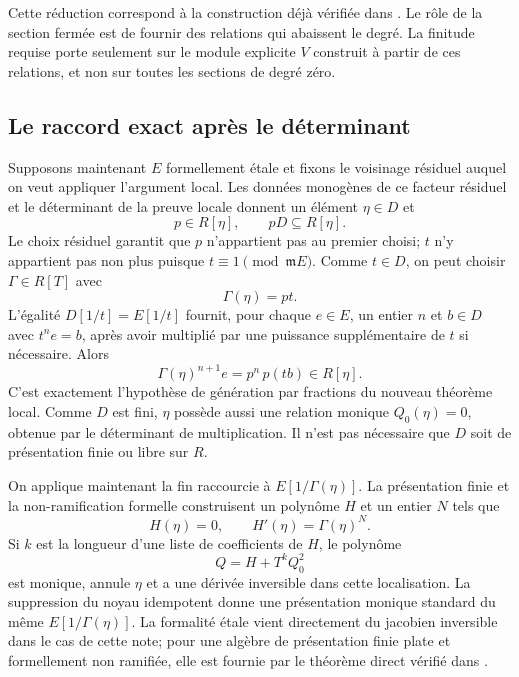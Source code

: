 \documentclass[11pt]{amsart}
\newcommand{\m}{\mathfrak m}
\begin{document}
Cette réduction correspond à la construction déjà vérifiée dans
. Le rôle de la section
fermée est de fournir des relations qui abaissent le degré. La finitude
requise porte seulement sur le module explicite $V$ construit à partir
de ces relations, et non sur toutes les sections de degré zéro.

\subsection{Le raccord exact après le déterminant}

Supposons maintenant $E$ formellement étale et fixons le voisinage
résiduel auquel on veut appliquer l'argument local. Les données
monogènes de ce facteur résiduel et le déterminant de la preuve locale
donnent un élément $\eta\in D$ et
\[
                p\in R[\eta],\qquad pD\subseteq R[\eta].
\]
Le choix résiduel garantit que $p$ n'appartient pas au premier choisi;
$t$ n'y appartient pas non plus puisque $t\equiv1\pmod{\m E}$.
Comme $t\in D$, on peut choisir $\Gamma\in R[T]$ avec
\[
                            \Gamma(\eta)=pt.
\]
L'égalité $D[1/t]=E[1/t]$ fournit, pour chaque $e\in E$, un entier
$n$ et $b\in D$ avec $t^ne=b$, après avoir multiplié par une
puissance supplémentaire de $t$ si nécessaire. Alors
\[
                 \Gamma(\eta)^{n+1}e=p^n\,p(tb)\in R[\eta].
\]
C'est exactement l'hypothèse de génération par fractions du nouveau
théorème local. Comme $D$ est fini, $\eta$ possède aussi une relation
monique $Q_0(\eta)=0$, obtenue par le déterminant de multiplication.
Il n'est pas nécessaire que $D$ soit de présentation finie ou libre
sur $R$.

On applique maintenant la fin raccourcie à
$E[1/\Gamma(\eta)]$. La présentation finie et la non-ramification
formelle construisent un polynôme $H$ et un entier $N$ tels que
\[
              H(\eta)=0,\qquad H'(\eta)=\Gamma(\eta)^N.
\]
Si $k$ est la longueur d'une liste de coefficients de $H$, le polynôme
\[
                          Q=H+T^kQ_0^2
\]
est monique, annule $\eta$ et a une dérivée inversible dans cette
localisation. La suppression du noyau idempotent donne une présentation
monique standard du même $E[1/\Gamma(\eta)]$.
La formalité étale vient directement du jacobien inversible dans le
cas de cette note; pour une algèbre de présentation finie plate et
formellement non ramifiée, elle est fournie par le théorème direct
vérifié dans .
\end{document}
